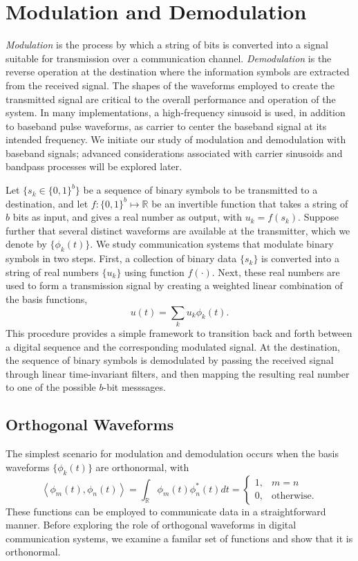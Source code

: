 \chapter{Modulation and Demodulation}

\emph{Modulation} is the process by which a string of bits is converted into a signal suitable for transmission over a communication channel.
\emph{Demodulation} is the reverse operation at the destination where the information symbols are extracted from the received signal.
The shapes of the waveforms employed to create the transmitted signal are critical to the overall performance and operation of the system.
In many implementations, a high-frequency sinusoid is used, in addition to baseband pulse waveforms, as carrier to center the baseband signal at its intended frequency.
We initiate our study of modulation and demodulation with baseband signals; advanced considerations associated with carrier sinusoids and bandpass processes will be explored later.

Let $\{ s_k \in \{ 0, 1 \}^b \}$ be a sequence of binary symbols to be transmitted to a destination, and let $f : \{ 0, 1 \}^b \mapsto \mathbb{R}$ be an invertible function that takes a string of $b$ bits as input, and gives a real number as output, with $u_k = f(s_k)$.
Suppose further that several distinct waveforms are available at the transmitter, which we denote by $\{ \phi_k (t) \}$.
We study communication systems that modulate binary symbols in two steps.
First, a collection of binary data $\{ s_k \}$ is converted into a string of real numbers $\{ u_k \}$ using function $f(\cdot)$.
Next, these real numbers are used to form a transmission signal by creating a weighted linear combination of the basis functions,
\begin{equation*}
u(t) = \sum_k u_k \phi_k(t) .
\end{equation*}
This procedure provides a simple framework to transition back and forth between a digital sequence and the corresponding modulated signal.
At the destination, the sequence of binary symbols is demodulated by passing the received signal through linear time-invariant filters, and then mapping the resulting real number to one of the possible $b$-bit messsages.


\section{Orthogonal Waveforms}

The simplest scenario for modulation and demodulation occurs when the basis waveforms $\{ \phi_k (t) \}$ are orthonormal, with
\begin{equation*}
\left\langle \phi_m (t), \phi_n (t) \right\rangle
= \int_{\mathbb{R}} \phi_m (t) \phi_n^* (t) dt 
= \begin{cases} 1, & m = n \\
0, & \text{otherwise} . \end{cases}
\end{equation*}
These functions can be employed to communicate data in a straightforward manner.
Before exploring the role of orthogonal waveforms in digital communication systems, we examine a familar set of functions and show that it is orthonormal.

